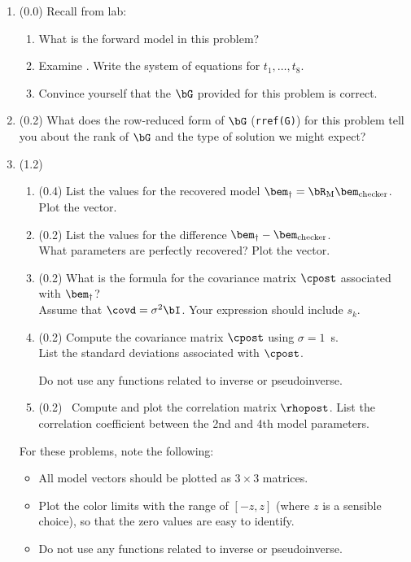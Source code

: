 \documentclass[11pt,titlepage,fleqn]{article}
\begin{document}

\begin{enumerate}

\item (0.0) Recall from lab:
%
\begin{enumerate}
\item What is the forward model in this problem?
\item Examine . Write the system of equations for $t_1, \ldots, t_8$.
\item Convince yourself that the $\bG$ provided for this problem is correct.
\end{enumerate}

\item (0.2) What does the row-reduced form of $\bG$ (\verb+rref(G)+) for this problem tell you about the rank of $\bG$ and the type of solution we might expect?

\item (1.2) 
\begin{enumerate}
\item (0.4) List the values for the recovered model $\bem_{\dagger} = \bR_{\rm M}\bem_{\rm checker}$. Plot the vector.

\item (0.2) List the values for the difference $\bem_{\dagger}-\bem_{\rm checker}$. \\
What parameters are perfectly recovered? Plot the vector.

\item (0.2) What is the formula for the covariance matrix $\cpost$ associated with $\bem_{\dagger}$? \\ Assume that $\covd = \sigma^2\bI$. Your expression should include $s_k$.

\item (0.2) Compute the covariance matrix $\cpost$ using $\sigma = 1$~s. \\
List the standard deviations associated with $\cpost$.

Do not use any functions related to inverse or pseudoinverse.

\item (0.2) \ptag\ Compute and plot the correlation matrix $\rhopost$. List the correlation coefficient between the 2nd and 4th model parameters.
\end{enumerate}

For these problems, note the following:
%
\begin{itemize}
\item All model vectors should be plotted as $3 \times 3$ matrices.
\item Plot the color limits with the range of $[-z,z]$ (where $z$ is a sensible choice), so that the zero values are easy to identify.
\item Do not use any functions related to inverse or pseudoinverse.
\end{itemize}


\end{enumerate}
\end{document}
